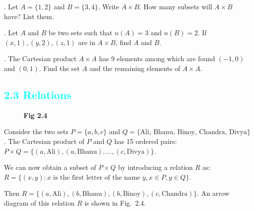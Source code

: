 \documentclass[11pt]{article}
\begin{document}
. Let $A=\{1,2\}$ and $B=\{3,4\}$. Write $A\times B$. How many subsets will $A\times B$ have? List them.

. Let $A$ and $B$ be two sets such that $n(A)=3$ and $n(B)=2$. If $(x, 1), (y, 2), (z, 1)$ are in $A\times B$, find $A$ and $B$.

. The Cartesian product $A \times A$ has 9 elements among which are found $(-1, 0)$ and $(0,1)$. Find the set $A$ and the remaining elements of $A \times A$.


\textcolor{cyan}{\section*{2.3 Relations}}

\begin{figure}
\centering
\vspace{-25pt} 
\caption*{\textbf{Fig 2.4}}
\end{figure}

Consider the two sets $P = \{a, b, c\}$ and $Q = \{\text{Ali, Bhanu, Binoy, Chandra, Divya}\}$. The Cartesian product of $P$ and $Q$ has 15 ordered pairs: $P \times Q = \{(a, \text{Ali}), (a, \text{Bhanu}), \dots, (c, \text{Divya})\}$. 

\vspace{0.5em}
We can now obtain a subset of $P \times Q$ by introducing a relation $R$ as:
$R = \{ (x,y) : x \text{ is the first letter of the name } y, x \in P, y \in Q \}$. 

\vspace{0.5em}

Then $R = \{(a, \text{Ali}), (b, \text{Bhanu}), (b, \text{Binoy}), (c, \text{Chandra})\}$.
An arrow diagram of this relation $R$ is shown in Fig.~2.4.
\end{document}
